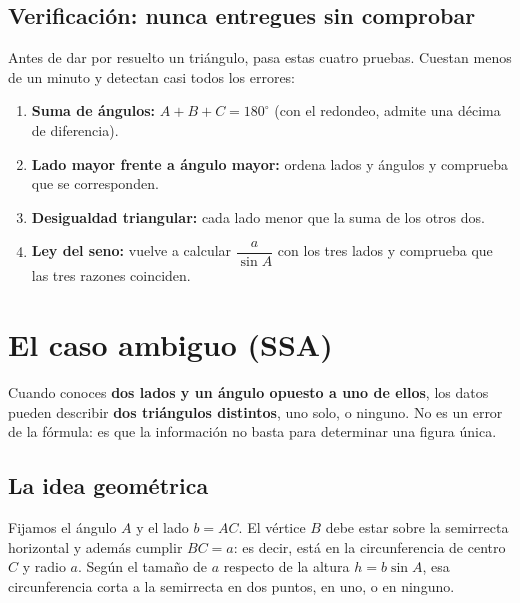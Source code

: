 \documentclass[12pt, letterpaper]{article}
\providecommand{\sen}{\sin}
\begin{document}
\subsection*{Verificación: nunca entregues sin comprobar}

\begin{cuadroadvertencia}
  \small
  Antes de dar por resuelto un triángulo, pasa estas cuatro pruebas. Cuestan
  menos de un minuto y detectan casi todos los errores:
  \begin{enumerate}[leftmargin=1.4em, nosep]
    \item \textbf{Suma de ángulos:} $A+B+C=180^{\circ}$ (con el redondeo,
          admite una décima de diferencia).
    \item \textbf{Lado mayor frente a ángulo mayor:} ordena lados y ángulos
          y comprueba que se corresponden.
    \item \textbf{Desigualdad triangular:} cada lado menor que la suma de los
          otros dos.
    \item \textbf{Ley del seno:} vuelve a calcular $\dfrac{a}{\sen A}$ con
          los tres lados y comprueba que las tres razones coinciden.
  \end{enumerate}
\end{cuadroadvertencia}

\section{El caso ambiguo (SSA)}

Cuando conoces \textbf{dos lados y un ángulo opuesto a uno de ellos}, los
datos pueden describir \textbf{dos triángulos distintos}, uno solo, o
ninguno. No es un error de la fórmula: es que la información no basta para
determinar una figura única.

\subsection*{La idea geométrica}

Fijamos el ángulo $A$ y el lado $b=AC$. El vértice $B$ debe estar sobre la
semirrecta horizontal y además cumplir $BC=a$: es decir, está en la
circunferencia de centro $C$ y radio $a$. Según el tamaño de $a$ respecto de
la altura $h=b\sen A$, esa circunferencia corta a la semirrecta en dos
puntos, en uno, o en ninguno.
\end{document}
